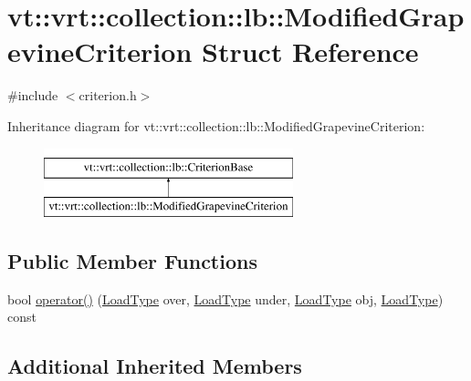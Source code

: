 \hypertarget{structvt_1_1vrt_1_1collection_1_1lb_1_1_modified_grapevine_criterion}{}\section{vt\+:\+:vrt\+:\+:collection\+:\+:lb\+:\+:Modified\+Grapevine\+Criterion Struct Reference}
\label{structvt_1_1vrt_1_1collection_1_1lb_1_1_modified_grapevine_criterion}


{\ttfamily \#include $<$criterion.\+h$>$}

Inheritance diagram for vt\+:\+:vrt\+:\+:collection\+:\+:lb\+:\+:Modified\+Grapevine\+Criterion\+:\begin{figure}[H]
\begin{center}
\leavevmode
\includegraphics[height=2.000000cm]{structvt_1_1vrt_1_1collection_1_1lb_1_1_modified_grapevine_criterion}
\end{center}
\end{figure}
\subsection*{Public Member Functions}
\begin{DoxyCompactItemize}
\item 
bool \hyperlink{structvt_1_1vrt_1_1collection_1_1lb_1_1_modified_grapevine_criterion_a6331ccac176ead3e10e58809f3e02ef8}{operator()} (\hyperlink{structvt_1_1vrt_1_1collection_1_1lb_1_1_criterion_base_a78e6b14fc6f7b34acac1d7cd4e850180}{Load\+Type} over, \hyperlink{structvt_1_1vrt_1_1collection_1_1lb_1_1_criterion_base_a78e6b14fc6f7b34acac1d7cd4e850180}{Load\+Type} under, \hyperlink{structvt_1_1vrt_1_1collection_1_1lb_1_1_criterion_base_a78e6b14fc6f7b34acac1d7cd4e850180}{Load\+Type} obj, \hyperlink{structvt_1_1vrt_1_1collection_1_1lb_1_1_criterion_base_a78e6b14fc6f7b34acac1d7cd4e850180}{Load\+Type}) const
\end{DoxyCompactItemize}
\subsection*{Additional Inherited Members}


